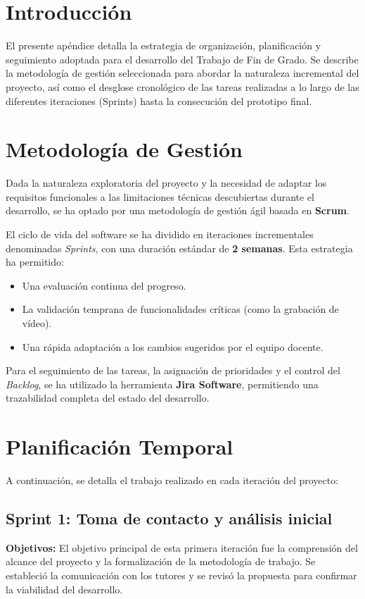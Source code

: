 \label{apendice:A}

\section{Introducción}
El presente apéndice detalla la estrategia de organización, planificación y seguimiento adoptada para el desarrollo del Trabajo de Fin de Grado. Se describe la metodología de gestión seleccionada para abordar la naturaleza incremental del proyecto, así como el desglose cronológico de las tareas realizadas a lo largo de las diferentes iteraciones (Sprints) hasta la consecución del prototipo final.

\section{Metodología de Gestión}
Dada la naturaleza exploratoria del proyecto y la necesidad de adaptar los requisitos funcionales a las limitaciones técnicas descubiertas durante el desarrollo, se ha optado por una metodología de gestión ágil basada en \textbf{Scrum}\cite{scrum_guide}.

El ciclo de vida del software se ha dividido en iteraciones incrementales denominadas \textit{Sprints}, con una duración estándar de \textbf{2 semanas}. Esta estrategia ha permitido:
\begin{itemize}
    \item Una evaluación continua del progreso.
    \item La validación temprana de funcionalidades críticas (como la grabación de vídeo).
    \item Una rápida adaptación a los cambios sugeridos por el equipo docente.
\end{itemize}

Para el seguimiento de las tareas, la asignación de prioridades y el control del \textit{Backlog}, se ha utilizado la herramienta \textbf{Jira Software}\cite{atlassian_jira}, permitiendo una trazabilidad completa del estado del desarrollo.

\section{Planificación Temporal}

A continuación, se detalla el trabajo realizado en cada iteración del proyecto:

\subsection{Sprint 1: Toma de contacto y análisis inicial}
\textbf{Objetivos:} El objetivo principal de esta primera iteración fue la comprensión del alcance del proyecto y la formalización de la metodología de trabajo. Se estableció la comunicación con los tutores y se revisó la propuesta para confirmar la viabilidad del desarrollo.

